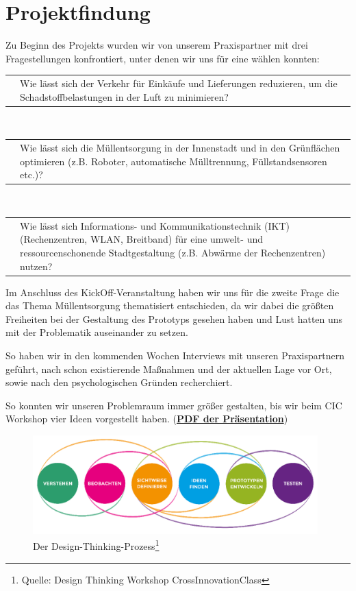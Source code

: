 \chapter{Projektfindung}\label{chp:projektfindung}

    Zu Beginn des Projekts wurden wir von unserem Praxispartner mit drei Fragestellungen konfrontiert, unter denen wir uns für eine wählen konnten:

    \vspace{1em}
    \begin{tabular}{ l|p{13.5cm} }
        \quad & Wie lässt sich der Verkehr für Einkäufe und Lieferungen reduzieren, um die Schadstoffbelastungen in der Luft zu minimieren?
    \end{tabular}
    \\[1em]
    \begin{tabular}{ l|p{13.5cm} }
        \quad & Wie lässt sich die Müllentsorgung in der Innenstadt und in den Grünflächen optimieren (z.B. Roboter, automatische Mülltrennung, Füllstandsensoren etc.)?
    \end{tabular}
    \\[1em]
    \begin{tabular}{ l|p{13.5cm} }
        \quad & Wie lässt sich Informations- und Kommunikationstechnik (IKT) (Rechenzentren, WLAN, Breitband) für eine umwelt- und ressourcenschonende Stadtgestaltung (z.B. Abwärme der Rechenzentren) nutzen? 
    \end{tabular}
    \vspace{1em}

    Im Anschluss des KickOff-Veranstaltung haben wir uns für die zweite Frage die das Thema Müllentsorgung thematisiert entschieden, da wir dabei die größten Freiheiten bei der Gestaltung des Prototyps gesehen haben und Lust hatten uns mit der Problematik auseinander zu setzen.

    So haben wir in den kommenden Wochen Interviews mit unseren Praxispartnern geführt, nach schon existierende Maßnahmen und der aktuellen Lage vor Ort, sowie nach den psychologischen Gründen recherchiert.
    
    So konnten wir unseren Problemraum immer größer gestalten, bis wir beim CIC Workshop vier Ideen vorgestellt haben. (\href{run:attachments/Frankfurt_Ideen_CIC.pdf}{\textbf{PDF der Präsentation}})

    \begin{figure}[h]
        \begin{center}
            \includegraphics[width=11cm]{media/00_introduction/design_thinking_2.png}
        \end{center}
        \caption{Der Design-Thinking-Prozess\protect\footnote{Quelle: Design Thinking Workshop CrossInnovationClass}}
        \label{fig:dt_2}
    \end{figure}

